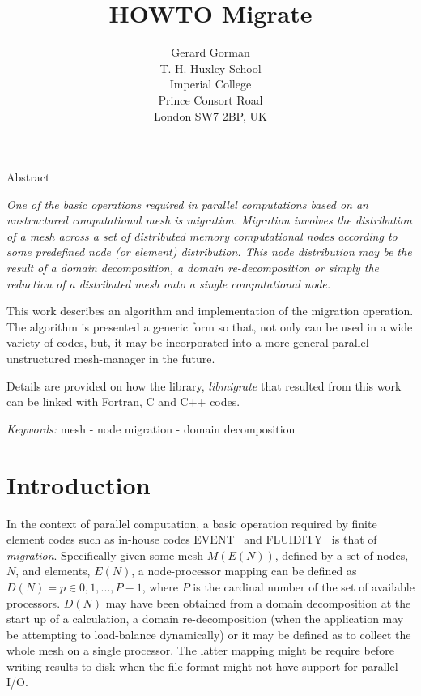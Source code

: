 \documentclass[11pt]{article}
\begin{document}

\date{}

\title{HOWTO Migrate}

\author{
Gerard Gorman             \\
T. H. Huxley School        \\
Imperial College            \\
Prince Consort Road          \\
London SW7 2BP, UK            \\
}

\maketitle
\thispagestyle{empty}

\noindent
{\bf

Abstract {\small\em One of the basic operations required in parallel
computations based on an unstructured computational mesh is {\it
migration}. Migration involves the distribution of a mesh across a set
of distributed memory computational nodes according to some predefined
node (or element) distribution. This node distribution may be the
result of a domain decomposition, a domain re-decomposition or simply
the reduction of a distributed mesh onto a single computational node.

This work describes an algorithm and implementation of the migration
operation. The algorithm is presented a generic form so that, not only
can be used in a wide variety of codes, but, it may be incorporated
into a more general parallel unstructured mesh-manager in the future.

Details are provided on how the library, {\it libmigrate} that
resulted from this work can be linked with Fortran, C and C++ codes.}
}

\vspace{0.5cm}
\noindent
{\it Keywords:}
 {\small mesh - node migration - domain decomposition}



\section{Introduction}
In the context of parallel computation, a basic operation required by
finite element codes such as in-house codes EVENT~\cite{EVENT} and
FLUIDITY~\cite{FLUIDITY} is that of {\it migration}. Specifically
given some mesh $M(E(N))$, defined by a set of nodes, $N$, and
elements, $E(N)$, a node-processor mapping can be defined as $D(N) = p
\in {0, 1,..., P-1}$, where $P$ is the cardinal number of the set of
available processors. $D(N)$ may have been obtained from a domain
decomposition at the start up of a calculation, a domain
re-decomposition (when the application may be attempting to
load-balance dynamically) or it may be defined as to collect the whole
mesh on a single processor. The latter mapping might be require before
writing results to disk when the file format might not have support
for parallel I/O.
\end{document}
